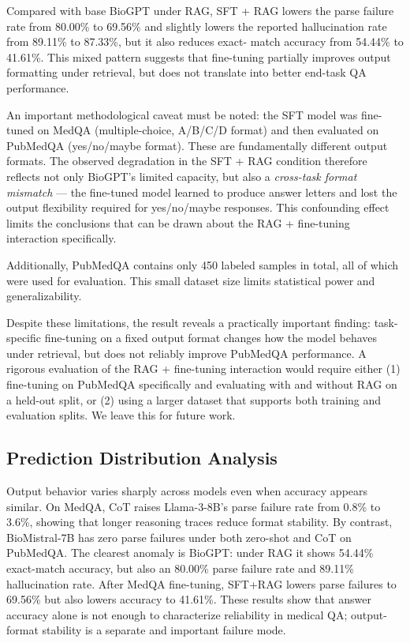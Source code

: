 \documentclass[11pt]{article}
\begin{document}
Compared with base BioGPT under RAG, SFT + RAG lowers the parse failure 
rate from 80.00\% to 69.56\% and slightly lowers the reported 
hallucination rate from 89.11\% to 87.33\%, but it also reduces exact-
match accuracy from 54.44\% to 41.61\%. This mixed pattern suggests 
that fine-tuning partially improves output formatting under retrieval, 
but does not translate into better end-task QA performance.

An important methodological caveat must be noted: the SFT model was 
fine-tuned on MedQA (multiple-choice, A/B/C/D format) and then 
evaluated on PubMedQA (yes/no/maybe format). These are fundamentally 
different output formats. The observed degradation in the SFT + RAG 
condition therefore reflects not only BioGPT's limited capacity, but 
also a \textit{cross-task format mismatch} --- the fine-tuned model 
learned to produce answer letters and lost the output flexibility 
required for yes/no/maybe responses. This confounding effect limits 
the conclusions that can be drawn about the RAG + fine-tuning 
interaction specifically.
 
Additionally, PubMedQA contains only 450 labeled samples in total, 
all of which were used for evaluation. This small dataset size limits 
statistical power and generalizability.

Despite these limitations, the result reveals a practically important 
finding: task-specific fine-tuning on a fixed output format changes how 
the model behaves under retrieval, but does not reliably improve 
PubMedQA performance. 
A rigorous evaluation of the RAG + fine-tuning interaction would 
require either (1) fine-tuning on PubMedQA specifically and evaluating 
with and without RAG on a held-out split, or (2) using a larger dataset 
that supports both training and evaluation splits. We leave this for 
future work.

\subsection{Prediction Distribution Analysis}

Output behavior varies sharply across models even when accuracy appears 
similar. On MedQA, CoT raises Llama-3-8B's parse failure rate from 0.8\% 
to 3.6\%, showing that longer reasoning traces reduce format stability. 
By contrast, BioMistral-7B has zero parse failures under both zero-shot 
and CoT on PubMedQA. The clearest anomaly is BioGPT: under RAG it shows 
54.44\% exact-match accuracy, but also an 80.00\% parse failure rate and 
89.11\% hallucination rate. After MedQA fine-tuning, SFT+RAG lowers 
parse failures to 69.56\% but also lowers accuracy to 41.61\%. These 
results show that answer accuracy alone is not enough to characterize 
reliability in medical QA; output-format stability is a separate and 
important failure mode.
\end{document}
